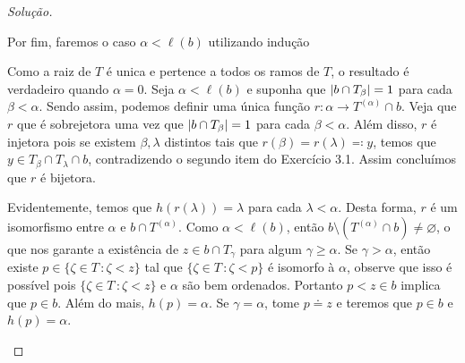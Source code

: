 \documentclass[a4paper]{article}
\begin{document}
\begin{proof}[Solução]
\begin{enumerate}[(i)]
Por fim, faremos o caso \(\alpha<\ell(b)\) utilizando indução%

Como a raiz de \(T\) é unica e pertence a todos os ramos de \(T\), o resultado é
verdadeiro quando \(\alpha = 0\). Seja \(\alpha < \ell(b)\)  e suponha que
\(\vert b \cap T_\beta \vert = 1\) para cada \(\beta < \alpha\).
Sendo assim, podemos definir uma única função \(r\colon\alpha\to
T^{(\alpha)}\cap b\). Veja que \(r\) que é sobrejetora uma vez que \(\vert b\cap
  T_\beta \vert=1\) para cada \(\beta<\alpha\). Além disso, \(r\) é injetora pois se
existem \(\beta,\lambda\) distintos tais que \(r(\beta)=r(\lambda)\eqqcolon y\), temos que
\(y\in T_\beta\cap T_\lambda\cap b\), contradizendo o segundo item do Exercício
3.1. Assim concluímos que \(r\) é bijetora.

Evidentemente,  temos que \(h(r(\lambda))=\lambda\) para cada \(\lambda
<\alpha\). Desta forma, \(r\) é um isomorfismo entre \(\alpha\) e \(b\cap
T^{(\alpha)}\). Como \(\alpha<\ell(b)\), então
\(b\setminus (T^{(\alpha)}\cap b)\neq\varnothing\), o que nos garante a
existência de \(z\in b\cap T_\gamma\) para algum \(\gamma\geq\alpha\). Se
\(\gamma>\alpha\), então existe \(p\in \{\zeta\in T\,\colon\zeta<z\}\) tal que
\(\{\zeta\in T\,\colon\zeta<p\}\) é isomorfo à
\(\alpha\), observe que isso é possível pois \(\{\zeta\in T\,\colon\zeta<z\}\) e
\(\alpha\) são bem ordenados. Portanto \(p<z\in b\) implica que \(p\in b\). Além
do mais, \(h(p)=\alpha\). Se \(\gamma=\alpha\), tome \(p\doteq z\) e teremos que
\(p\in b\) e \(h(p)=\alpha\).


\par 


\end{enumerate}
\end{proof}
\end{document}
